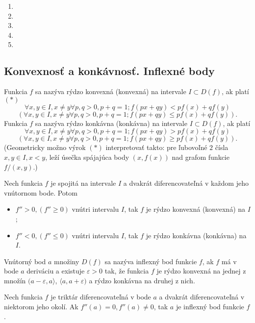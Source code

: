 \begin{enumerate}[resume]
	\item {}
	\item {}
	\item {}
	\item {}
	\item {}
\end{enumerate}

\subsection{Konvexnosť a konkávnosť. Inflexné body}
Funkcia $f$ sa nazýva rýdzo konvexná (konvexná) na intervale $I \subset D(f)$, ak platí $(*)$
$$\forall x,y\in I,x\neq y \forall p,q>0,p+q=1;f(px+qy)<pf(x)+qf(y)$$
$$(\forall x,y\in I,x\neq y \forall p,q>0,p+q=1;f(px+qy)\leq pf(x)+qf(y)).$$
Funkcia $f$ sa nazýva rýdzo konkávna (konkávna) na intervale $I \subset D(f)$, ak platí
$$\forall x,y\in I,x\neq y \forall p,q>0,p+q=1;f(px+qy)>pf(x)+qf(y)$$
$$(\forall x,y\in I,x\neq y \forall p,q>0,p+q=1;f(px+qy)\geq pf(x)+qf(y)).$$
(Geometricky možno výrok $(*)$ interpretovať takto: pre ľubovoľné $2$ čísla $x,y\in I,x<y$, leží úsečka spájajúca body $(x,f(x))$ nad grafom funkcie $f/(x,y)$.)

\begin{veta}
Nech funkcia $f$ je spojitá na intervale $I$ a dvakrát diferencovateľná v každom jeho vnútornom bode. Potom
\begin{itemize}
\item $f''>0,(f''\geq 0)$ vnútri intervalu $I$, tak $f$ je rýdzo konvexná (konvexná) na $I$;
\item $f''<0,(f''\leq 0)$ vnútri intervalu $I$, tak $f$ je rýdzo konkávna (konkávna) na $I$.
\end{itemize}
Vnútorný bod $a$ množiny $D(f)$ sa nazýva inflexný bod funkcie $f$, ak $f$ má v bode $a$ deriváciu a existuje $\varepsilon >0$ tak, že funkcia $f$ je rýdzo konvexná na jednej z množín $(a-\varepsilon,a\rangle$, $\langle a,a+\varepsilon )$ a rýdzo konkávna na druhej z nich.
\end{veta}

\begin{veta}
Nech funkcia $f$ je triktár diferencovateľná v bode $a$ a dvakrát diferencovateľná v niektorom jeho okolí. Ak $f''(a)=0,f''(a)\neq 0$, tak $a$ je inflexný bod funkcie $f$.
\end{veta}

